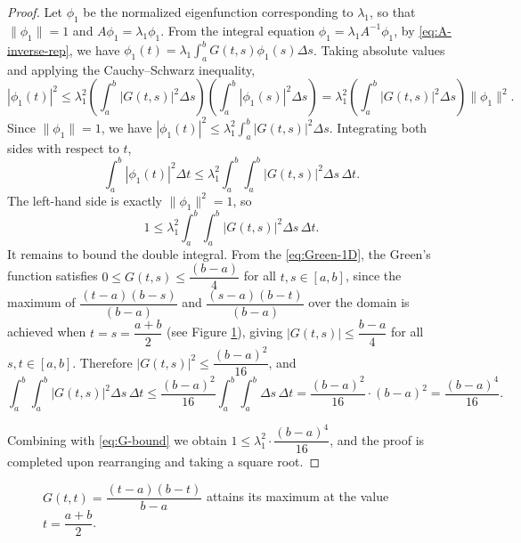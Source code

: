 \documentclass{article}
\numberwithin{equation}{section}
\numberwithin{theorem}{section}
\begin{document}
\begin{proof}
Let $\phi_1$ be the normalized eigenfunction corresponding to $\lambda_1$, so that $\|\phi_1\| = 1$ and $A\phi_1 = \lambda_1 \phi_1$. From the integral equation $\phi_1 = \lambda_1 A^{-1} \phi_1$, by \eqref{eq:A-inverse-rep}, we have $\phi_1(t) = \lambda_1 \displaystyle\int_a^b G(t,s) \phi_1(s) \Delta s$. Taking absolute values and applying the Cauchy--Schwarz inequality,
\[
|\phi_1(t)|^2 \leq \lambda_1^2 \left( \int_a^b |G(t,s)|^2 \Delta s \right) \left( \int_a^b |\phi_1(s)|^2 \Delta s \right) = \lambda_1^2 \left( \int_a^b |G(t,s)|^2 \Delta s \right) \|\phi_1\|^2.
\]
Since $\|\phi_1\| = 1$, we have $|\phi_1(t)|^2 \leq \lambda_1^2 \int_a^b |G(t,s)|^2 \Delta s.$
Integrating both sides with respect to $t$,
\[
\int_a^b |\phi_1(t)|^2 \Delta t \leq \lambda_1^2 \int_a^b \int_a^b |G(t,s)|^2 \Delta s \, \Delta t.
\]
The left-hand side is exactly $\|\phi_1\|^2 = 1$, so
\begin{equation}
\label{eq:G-bound}
1 \leq \lambda_1^2 \int_a^b \int_a^b |G(t,s)|^2 \Delta s \, \Delta t.    
\end{equation}
It remains to bound the double integral. From the \eqref{eq:Green-1D}, the Green's function satisfies $0 \leq G(t,s) \leq \dfrac{(b-a)}{4}$ for all $t, s \in [a,b]$, since the maximum of $\dfrac{(t-a)(b-s)}{(b-a)}$ and $\dfrac{(s-a)(b-t)}{(b-a)}$ over the domain is achieved when $t = s = \dfrac{a+b}{2}$ (see Figure \ref{fig:Green-diagonal}), giving  $|G(t,s)| \le \dfrac{b-a}{4}$ for all $s,t \in [a,b] $. Therefore $|G(t,s)|^2 \leq \dfrac{(b-a)^2}{16}$, and
\[
\int_a^b \int_a^b |G(t,s)|^2 \Delta s \, \Delta t \leq \frac{(b-a)^2}{16} \int_a^b \int_a^b \Delta s \, \Delta t = \frac{(b-a)^2}{16} \cdot (b-a)^2 = \frac{(b-a)^4}{16}.
\]

Combining with \eqref{eq:G-bound} we obtain $1 \leq \lambda_1^2 \cdot \dfrac{(b-a)^4}{16}$, and the proof is completed upon rearranging and taking a square root.
\end{proof}
\begin{figure}[h]
\centering
{}
\caption{$G(t,t) = \dfrac{(t-a)(b-t)}{b-a}$ attains its maximum at the value $t = \dfrac{a+b}{2}$.}
\label{fig:Green-diagonal}
\end{figure}
\end{document}
